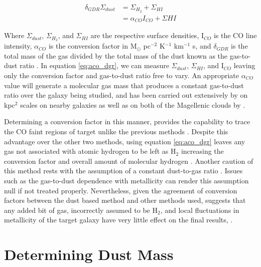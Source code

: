\begin{equation}\label{eq:aco_dgr}
  \begin{split}
    \delta_{GDR}\Sigma_{dust} & = \Sigma_{H_2} + \Sigma_{HI} \\
    						  & = \alpha_{CO} I_{CO} + \Sigma{HI}
  \end{split}
\end{equation}

Where $\Sigma_{dust}$, $\Sigma_{H_2}$, and $\Sigma_{HI}$ are the respective surface densities, I$_{CO}$ is the CO line intensity, $\alpha_{CO}$ is the conversion factor in M$_\odot$ pc$^{-2}$ K$^{-1}$ km$^{-1}$ s, and $\delta_{GDR}$ is the total mass of the gas divided by the total mass of the dust known as the gas-to-dust ratio \citep{leroy2011,sandstrom2013}.  In equation \ref{eq:aco_dgr}, we can measure $\Sigma_{dust}$, $\Sigma_{HI}$, and I$_{CO}$ leaving only the conversion factor and gas-to-dust ratio free to vary.  An appropriate $\alpha_{CO}$ value will generate a molecular gas mass that produces a constant gas-to-dust ratio over the galaxy being studied, and has been carried out extensively by \cite{sandstrom2013} on kpc$^2$ scales on nearby galaxies as well as on both of the Magellenic clouds by \cite{leroy2011}.

Determining a conversion factor in this manner, provides the capability to trace the CO faint regions of target unlike the previous methods \citep{israel1997}.  Despite this advantage over the other two methods, using equation \ref{eq:aco_dgr} leaves any gas not associated with atomic hydrogen to be left as H$_2$ increasing the conversion factor and overall amount of molecular hydrogen \citep{bolatto2013}.  Another caution of this method rests with the assumption of a constant dust-to-gas ratio \citep{bolatto2013}.  Issues such as the gas-to-dust dependence with metallicity \citep{draine2007} can render this assumption null if not treated properly.  Nevertheless, given the agreement of conversion factors between the dust based method and other methods used, suggests that any added bit of gas, incorrectly assumed to be H$_2$, and local fluctuations in metallicity of the target galaxy have very little effect on the final results, \citep{bolatto2013}.

\section{Determining Dust Mass}

